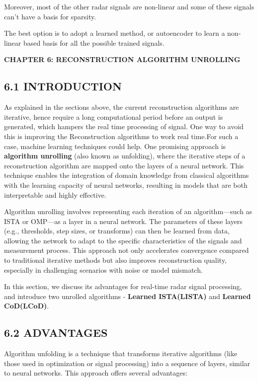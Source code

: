\documentclass[
  letterpaper,
  DIV=11,
  numbers=noendperiod]{scrartcl}
\providecommand{\mainsection}[1]{\begin{center}{\rmfamily\textbf{\fontsize{14}{20}\selectfont #1}}\end{center}}
\begin{document}
Moreover, most of the other radar signals are non-linear and some of
these signals can't have a basis for sparsity.

The best option is to adopt a learned method, or autoencoder to learn a
non-linear based basis for all the possible trained signals.

\newpage

\mainsection{CHAPTER 6: RECONSTRUCTION ALGORITHM UNROLLING}

\subsection{6.1 INTRODUCTION}\label{introduction-3}

As explained in the sections above, the current reconstruction
algorithms are iterative, hence require a long computational period
before an output is generated, which hampers the real time processing of
signal. One way to avoid this is improving the Reconstruction algorithms
to work real time.For such a case, machine learning techniques could
help. One promising approach is \textbf{algorithm unrolling} (also known
as unfolding), where the iterative steps of a reconstruction algorithm
are mapped onto the layers of a neural
network\autocite{fast-sparse-coding}. This technique enables the
integration of domain knowledge from classical algorithms with the
learning capacity of neural networks, resulting in models that are both
interpretable and highly effective.

Algorithm unrolling involves representing each iteration of an
algorithm---such as ISTA or OMP---as a layer in a neural network. The
parameters of these layers (e.g., thresholds, step sizes, or transforms)
can then be learned from data, allowing the network to adapt to the
specific characteristics of the signals and measurement process. This
approach not only accelerates convergence compared to traditional
iterative methods but also improves reconstruction quality, especially
in challenging scenarios with noise or model mismatch.

In this section, we discuss its advantages for real-time radar signal
processing, and introduce two unrolled algorithms - \textbf{Learned
ISTA(LISTA)} and \textbf{Learned CoD(LCoD)}.

\subsection{6.2 ADVANTAGES}\label{advantages}

Algorithm unfolding is a technique that transforms iterative algorithms
(like those used in optimization or signal processing) into a sequence
of layers, similar to neural networks. This approach offers several
advantages:
\end{document}
